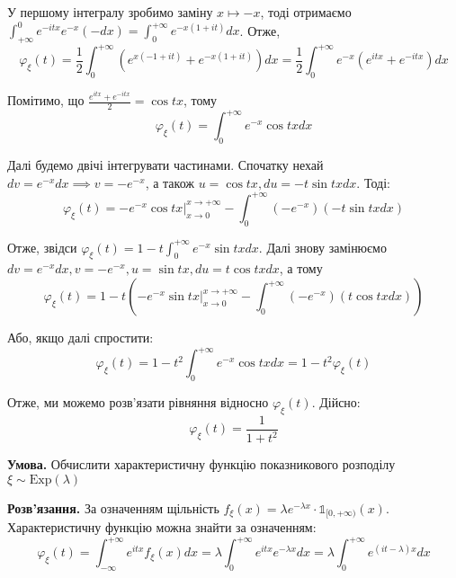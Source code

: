 \documentclass[oneside,solution]{karazin-prob-theory-assign}
\begin{document}
У першому інтегралу зробимо заміну $x \mapsto -x$, тоді отримаємо $\int_{+\infty}^0 e^{-itx}e^{-x}(-dx)=\int_0^{+\infty}e^{-x(1+it)}dx$. Отже,
\begin{equation}
    \varphi_{\xi}(t) = \frac{1}{2}\int_0^{+\infty}\left(e^{x(-1+it)}+e^{-x(1+it)}\right)dx = \frac{1}{2}\int_0^{+\infty}e^{-x}(e^{itx} + e^{-itx})dx
\end{equation}

Помітимо, що $\frac{e^{itx}+e^{-itx}}{2}=\cos tx$, тому
\begin{equation}
    \varphi_{\xi}(t) = \int_0^{+\infty}e^{-x}\cos tx dx
\end{equation}

Далі будемо двічі інтегрувати частинами. Спочатку нехай $dv=e^{-x}dx \implies v=-e^{-x}$, а також $u=\cos tx, du=-t\sin txdx$. Тоді:
\begin{equation}
    \varphi_{\xi}(t) = -e^{-x}\cos tx \Big|_{x \to 0}^{x \to +\infty} - \int_0^{+\infty} (-e^{-x})(-t\sin txdx)
\end{equation}

Отже, звідси $\varphi_{\xi}(t) = 1 - t\int_0^{+\infty}e^{-x}\sin tx dx$. Далі знову замінюємо $dv=e^{-x}dx,v=-e^{-x}, u=\sin tx, du=t\cos tx dx$, а тому
\begin{equation}
    \varphi_{\xi}(t) = 1 - t\left(-e^{-x}\sin tx \Big|_{x \to 0}^{x \to +\infty} - \int_0^{+\infty}(-e^{-x})(t\cos txdx)\right)
\end{equation}

Або, якщо далі спростити:
\begin{equation}
    \varphi_{\xi}(t) = 1 - t^2\int_0^{+\infty}e^{-x}\cos tx dx = 1 - t^2\varphi_{\xi}(t)
\end{equation}

Отже, ми можемо розв'язати рівняння відносно $\varphi_{\xi}(t)$. Дійсно:
\begin{equation}
    \boxed{\varphi_{\xi}(t) = \frac{1}{1+t^2}}
\end{equation}


\hspace{20px}\textbf{Умова.} Обчислити характеристичну функцію показникового розподілу $\xi \sim \text{Exp}(\lambda)$

\textbf{Розв'язання.} За означенням щільність $f_{\xi}(x) = \lambda e^{-\lambda x}\cdot\mathds{1}_{[0,+\infty)}(x)$. Характеристичну функцію можна знайти за означенням:
\begin{equation}
    \varphi_{\xi}(t) = \int_{-\infty}^{+\infty}e^{itx}f_{\xi}(x)dx = \lambda\int_0^{+\infty}e^{itx}e^{-\lambda x}dx = \lambda\int_0^{+\infty}e^{(it-\lambda)x}dx
\end{equation}
\end{document}
